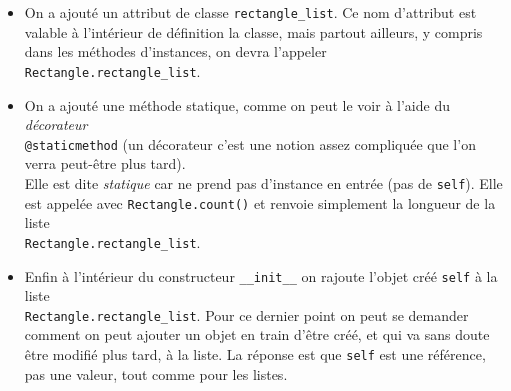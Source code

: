 \documentclass[a4paper,10pt,cours,firamath]{nsi}
\begin{document}
\begin{itemize}
    \item     On a ajouté un attribut de classe \texttt{rectangle_list}. Ce nom d'attribut est valable à l'intérieur de définition la classe, mais partout ailleurs, y compris dans les méthodes d'instances, on devra l'appeler \texttt{Rectangle.rectangle_list}.
    \item     On a ajouté une méthode statique, comme on peut le voir à l'aide du \textit{décorateur}\\ \texttt{@staticmethod} (un décorateur c'est une notion assez compliquée que l'on verra peut-être plus tard).\\
          Elle est dite \textit{statique} car ne prend pas d'instance en entrée (pas de \texttt{self}). Elle est appelée avec \texttt{Rectangle.count()} et renvoie simplement la longueur de la liste \\\texttt{Rectangle.rectangle_list}.
    \item    Enfin à l'intérieur du constructeur \texttt{__init__} on rajoute l'objet créé \texttt{self} à la liste\\ \texttt{Rectangle.rectangle_list}. Pour ce dernier point on peut se demander comment on peut ajouter un objet en train d'être créé, et qui va sans doute être modifié plus tard, à la liste. La réponse est que \texttt{self} est une référence, pas une valeur, tout comme pour les listes.
\end{itemize}
\end{document}
